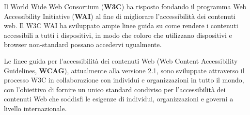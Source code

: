 Il World Wide Web Consortium (\textbf{W3C}) ha risposto fondando il programma Web Accessibility Initiative (\textbf{WAI}) al fine di migliorare l'accessibilità dei contenuti web. Il W3C WAI ha sviluppato ampie linee guida su come rendere i contenuti accessibili a tutti i dispositivi, in modo che coloro che utilizzano dispositivi e browser non-standard possano accedervi ugualmente.

Le linee guida per l'accessibilità dei contenuti Web (Web Content Accessibility Guidelines, \textbf{WCAG}), attualmente alla versione 2.1, sono sviluppate attraverso il processo W3C in collaborazione con individui e organizzazioni in tutto il mondo, con l'obiettivo di fornire un unico standard condiviso per l'accessibilità dei contenuti Web che soddisfi le esigenze di individui, organizzazioni e governi a livello internazionale\cite{wcag}.

